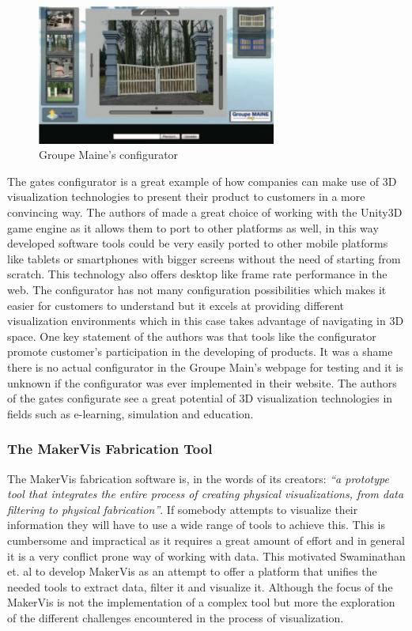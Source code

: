 \documentclass[../medieninformatik-arbeit.tex]{subfiles}
\begin{document}
\begin{figure}[hb]
\begin{center}
  \includegraphics[width=0.7\textwidth]{RelatedWork/img/gates-config}
  \caption{Groupe Maine's configurator\cite{rolland2012commerce} }
\label{fig:gates-config}
\end{center}
\end{figure}

The gates configurator is a great example of how companies can make use of 3D visualization technologies to present their product to customers in a more convincing way. The authors of made a great choice of working with the Unity3D game engine as it allows them to port to other platforms as well, in this way developed software tools could be very easily ported to other mobile platforms like tablets or smartphones with bigger screens without the need of starting from scratch. This technology also offers desktop like frame rate performance in the web. The configurator has not many configuration possibilities which makes it easier for customers to understand but it excels at providing different visualization environments which in this case takes advantage of navigating in 3D space. One key statement of the authors was that tools like the configurator promote customer's participation in the developing of products. It was a shame there is no actual configurator in the Groupe Main's webpage for testing and it is unknown if the configurator was ever implemented in their website. The authors of the gates configurate see a great potential of 3D visualization technologies in fields such as e-learning, simulation and education.

\subsubsection{The MakerVis Fabrication Tool}
The MakerVis fabrication software is, in the words of its creators: \textit{``a prototype tool that integrates the entire process of creating physical visualizations, from data filtering to physical fabrication''}\cite{swaminathan2014supporting}. If somebody attempts to visualize their information they will have to use a wide range of tools to achieve this. This is cumbersome and impractical as it requires a great amount of effort and in general it is a very conflict prone way of working with data. This motivated Swaminathan et. al to develop MakerVis as an attempt to offer a platform that unifies the needed tools to extract data, filter it and visualize it. Although the focus of the MakerVis is not the implementation of a complex tool but more the exploration of the different challenges encountered in the process of visualization.
\end{document}

